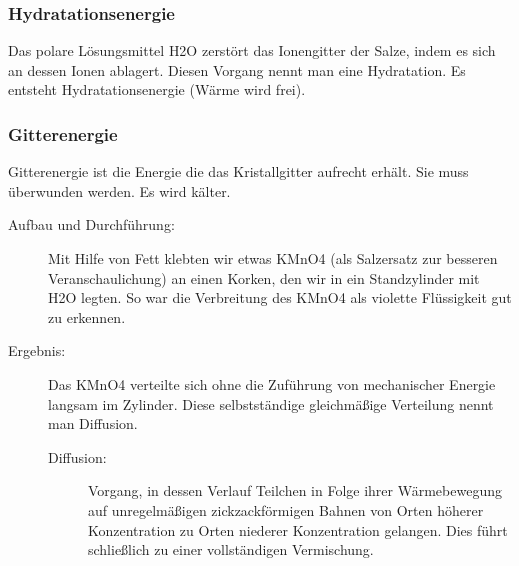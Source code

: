 \subsubsection{Hydratationsenergie}
Das polare Lösungsmittel \ac{H2O} zerstört das Ionengitter der Salze, indem es sich an dessen Ionen ablagert.
Diesen Vorgang nennt man eine Hydratation. Es entsteht Hydratationsenergie (Wärme wird frei).
\vspace{-0.7cm}
\begin{center}
\end{center}

\subsubsection{Gitterenergie}
Gitterenergie ist die Energie die das Kristallgitter aufrecht erhält. Sie muss überwunden werden. Es wird kälter.

\begin{description}
   \item[Aufbau und Durchführung:] Mit Hilfe von Fett klebten wir etwas \ac{KMnO4} (als Salzersatz zur besseren Veranschaulichung) an einen Korken, den wir in ein Standzylinder mit \ac{H2O} legten. So war die Verbreitung des \ac{KMnO4} als violette Flüssigkeit gut zu erkennen.
   \item[Ergebnis:] Das \ac{KMnO4} verteilte sich ohne die Zuführung von mechanischer Energie langsam im Zylinder.
Diese selbstständige gleichmäßige Verteilung nennt man Diffusion.
\begin{description}
   \item[Diffusion:] Vorgang, in dessen Verlauf Teilchen in Folge ihrer Wärmebewegung auf
 unregelmäßigen zickzackförmigen Bahnen von Orten höherer Konzentration
 zu Orten niederer Konzentration gelangen. Dies führt schließlich zu einer vollständigen Vermischung.
\end{description}
\end{description}

